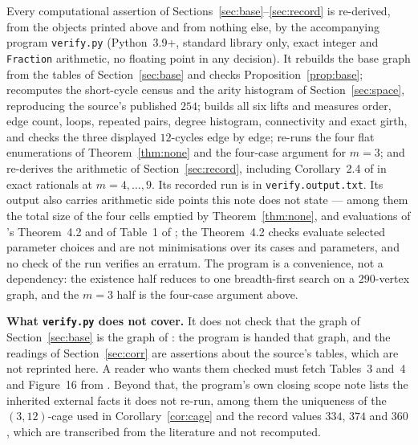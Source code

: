 \documentclass[11pt]{amsart}
\theoremstyle{remark}
\begin{document}
Every computational assertion of Sections~\ref{sec:base}--\ref{sec:record} is re-derived, from
the objects printed above and from nothing else, by the accompanying program \texttt{verify.py}
(Python~3.9+, standard library
only, exact integer and \texttt{Fraction} arithmetic, no floating point in any decision). It
rebuilds the base graph from the tables of Section~\ref{sec:base} and checks
Proposition~\ref{prop:base}; recomputes the short-cycle census and the arity histogram of
Section~\ref{sec:space}, reproducing the source's published $254$; builds all six lifts and
measures order, edge count, loops, repeated pairs, degree histogram, connectivity and exact
girth, and checks the three displayed $12$-cycles edge by edge; re-runs the four flat
enumerations of Theorem~\ref{thm:none} and the four-case argument for $m=3$; and re-derives the
arithmetic of Section~\ref{sec:record}, including Corollary~2.4 of \cite{AAB} in exact
rationals at $m=4,\dots,9$. Its recorded run is in
\texttt{verify.output.txt}. Its output
also carries arithmetic side points this note does not state --- among them the total size of the
four cells emptied by Theorem~\ref{thm:none}, and evaluations of \cite{GJV}'s Theorem~4.2 and of
Table~1 of \cite{AAB}; the Theorem~4.2 checks evaluate selected parameter choices and are not
minimisations over its cases and parameters, and no check of the run verifies an erratum. The
program
is a convenience, not a dependency: the existence half reduces to one breadth-first search on a
$290$-vertex graph, and the $m=3$ half is the four-case argument above.

\medskip
\noindent\textbf{What \texttt{verify.py} does not cover.} It does not check that the graph of
Section~\ref{sec:base} is the graph of \cite[Figure~16]{AAB}: the program is handed that graph,
and the readings of Section~\ref{sec:corr} are assertions about the source's tables, which are
not reprinted here. A reader who wants them checked must fetch Tables~3 and~4 and Figure~16 from
\cite{AAB}. Beyond that, the program's own closing scope note lists the inherited external facts
it does not re-run, among them the uniqueness of the $(3,12)$-cage used in
Corollary~\ref{cor:cage} and the record values $334$, $374$ and $360$, which are transcribed
from the literature and not recomputed.
\end{document}
